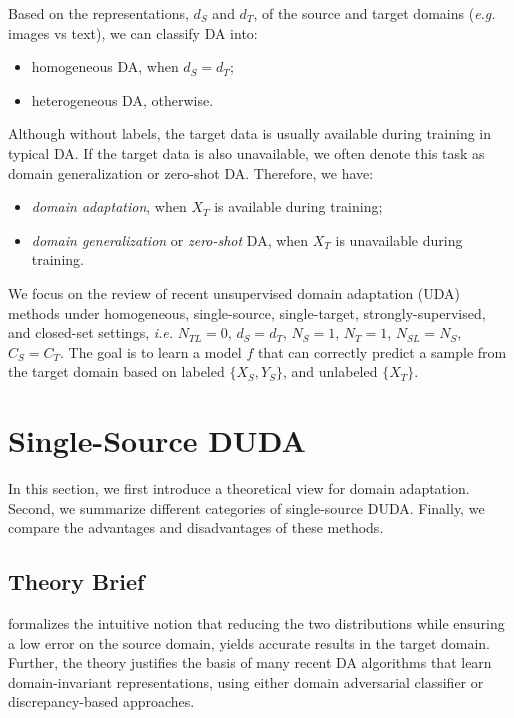 \documentclass[conference]{IEEEtran}
\begin{document}
Based on the representations, $d_S$ and $d_T$, of the source and
target domains (\textit{e.g.} images vs text), we can classify DA into:
\begin{itemize}
    \item homogeneous DA, when $d_S = d_T$;
    \item heterogeneous DA, otherwise.
\end{itemize}

Although without labels, the target data is usually available during 
training in typical DA. 
If the target data is also unavailable, we often denote this task as 
domain generalization or zero-shot DA. Therefore, we have:
\begin{itemize}
    \item \textit{domain adaptation}, when $X_T$ is available during training;
    \item \textit{domain generalization} or \textit{zero-shot} DA, when 
    $X_T$ is unavailable during training. 
\end{itemize}

We focus on the review of recent unsupervised domain adaptation (UDA)
methods under homogeneous, single-source, single-target, strongly-supervised,
and closed-set settings, \textit{i.e.} $N_{TL} = 0$, $d_S = d_T$, 
$N_S = 1$, $N_T=1$, $N_{SL} = N_S$, $C_S = C_T$. 
The goal is to learn a model $f$ that can correctly predict a sample
from the target domain based on labeled $\{X_S, Y_S\}$, and unlabeled 
$\{X_T\}$.

\section{Single-Source DUDA}
In this section, we first introduce a theoretical view for domain adaptation.
Second, we summarize different categories of single-source DUDA. 
Finally, we compare the advantages and disadvantages of these methods.

\subsection{Theory Brief}
\cite{b1} formalizes the intuitive notion that reducing the two distributions
while ensuring a low error on the source domain, yields accurate results in 
the target domain. 
Further, the theory justifies the basis of many recent DA algorithms that 
learn domain-invariant representations, using either domain adversarial 
classifier or discrepancy-based approaches.
\end{document}
